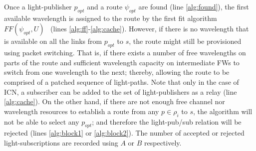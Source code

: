 \documentclass[journal]{IEEEtran}
\begin{document}
 Once a light-publisher $p_{opt}$ and a route $\psi_{opt}$ are found (line \ref{alg:found}), the first available wavelength is assigned to the route by the first fit algorithm $FF(\psi_{opt}, U)$~\cite{raj:alloptic} (lines \ref{alg:ff}-\ref{alg:cache}).
 However, if there is no wavelength that is available on all the links from $p_{opt}$ to $s$, the route might still be provisioned using packet switching. 
That is, if there exists a number of free wavelengths on parts of the route and sufficient wavelength capacity on intermediate FWs to switch from one wavelength to the next; thereby, allowing the route to be comprised of a patched sequence of light-paths. Note that only in the case of ICN, a subscriber can be added to the set of light-publishers as a relay (line \ref{alg:cache}). 
 On the other hand, if there are not enough free channel nor
 wavelength resources to establish a route from any $p \in \rho_i$ to $s$,
 the algorithm will not be able to select any $p_{opt}$; and
 therefore the light-pub/sub relation will be rejected (lines
 \ref{alg:block1} or \ref{alg:block2}). The number of accepted or
 rejected light-subscriptions are recorded using $A$ or $B$ respectively.
\end{document}
